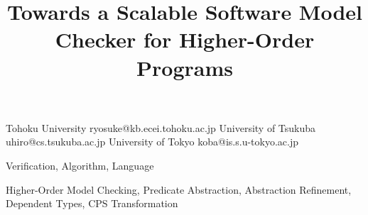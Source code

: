 \documentclass[preprint]{sigplanconf}
\begin{document}
\copyrightdata{[to be supplied]}

\title{Towards a Scalable Software Model Checker for Higher-Order Programs}

           {Tohoku University}
           {ryosuke@kb.ecei.tohoku.ac.jp}
           {University of Tsukuba}
           {uhiro@cs.tsukuba.ac.jp}
           {University of Tokyo}
           {koba@is.s.u-tokyo.ac.jp}

\maketitle




\terms
Verification, Algorithm, Language

\keywords
Higher-Order Model Checking,
Predicate Abstraction, Abstraction Refinement,
Dependent Types, CPS Transformation


%













%
\end{document}
